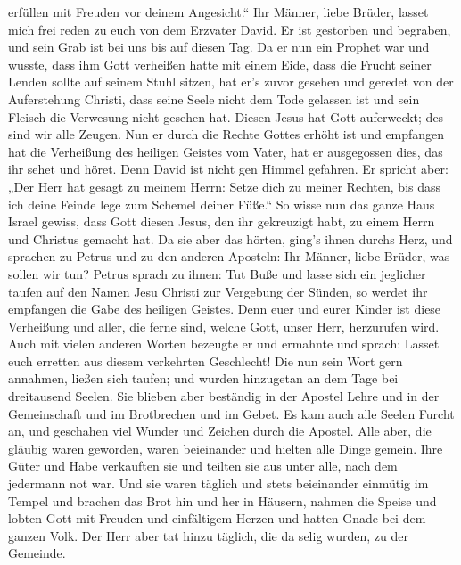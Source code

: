 erfüllen mit Freuden vor deinem Angesicht.``  Ihr Männer,
liebe Brüder, lasset mich frei reden zu euch von dem Erzvater David. Er
ist gestorben und begraben, und sein Grab ist bei uns bis auf diesen
Tag.  Da er nun ein Prophet war und wusste, dass ihm Gott
verheißen hatte mit einem Eide, dass die Frucht seiner Lenden sollte auf
seinem Stuhl sitzen,  hat er's zuvor gesehen und geredet
von der Auferstehung Christi, dass seine Seele nicht dem Tode gelassen
ist und sein Fleisch die Verwesung nicht gesehen hat. 
Diesen Jesus hat Gott auferweckt; des sind wir alle Zeugen.
 Nun er durch die Rechte Gottes erhöht ist und empfangen
hat die Verheißung des heiligen Geistes vom Vater, hat er ausgegossen
dies, das ihr sehet und höret.  Denn David ist nicht gen
Himmel gefahren. Er spricht aber: „Der Herr hat gesagt zu meinem Herrn:
Setze dich zu meiner Rechten,  bis dass ich deine Feinde
lege zum Schemel deiner Füße.``  So wisse nun das ganze
Haus Israel gewiss, dass Gott diesen Jesus, den ihr gekreuzigt habt, zu
einem Herrn und Christus gemacht hat.  Da sie aber das
hörten, ging's ihnen durchs Herz, und sprachen zu Petrus und zu den
anderen Aposteln: Ihr Männer, liebe Brüder, was sollen wir tun?
 Petrus sprach zu ihnen: Tut Buße und lasse sich ein
jeglicher taufen auf den Namen Jesu Christi zur Vergebung der Sünden, so
werdet ihr empfangen die Gabe des heiligen Geistes.  Denn
euer und eurer Kinder ist diese Verheißung und aller, die ferne sind,
welche Gott, unser Herr, herzurufen wird.  Auch mit vielen
anderen Worten bezeugte er und ermahnte und sprach: Lasset euch erretten
aus diesem verkehrten Geschlecht!  Die nun sein Wort gern
annahmen, ließen sich taufen; und wurden hinzugetan an dem Tage bei
dreitausend Seelen.  Sie blieben aber beständig in der
Apostel Lehre und in der Gemeinschaft und im Brotbrechen und im Gebet.
 Es kam auch alle Seelen Furcht an, und geschahen viel
Wunder und Zeichen durch die Apostel.  Alle aber, die
gläubig waren geworden, waren beieinander und hielten alle Dinge gemein.
 Ihre Güter und Habe verkauften sie und teilten sie aus
unter alle, nach dem jedermann not war.  Und sie waren
täglich und stets beieinander einmütig im Tempel und brachen das Brot
hin und her in Häusern,  nahmen die Speise und lobten Gott
mit Freuden und einfältigem Herzen und hatten Gnade bei dem ganzen Volk.
Der Herr aber tat hinzu täglich, die da selig wurden, zu der Gemeinde.
